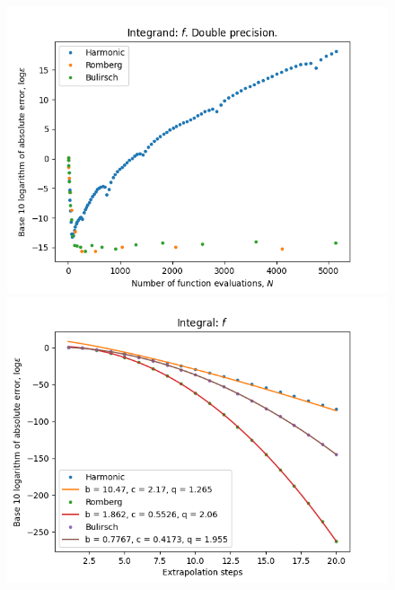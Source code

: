 \begin{figure}[H]
\centering
\begin{minipage}{0.45\textwidth}
\centering
\includegraphics[scale=0.45]{romberg_plots/cos_squared.png}
\end{minipage}
\begin{minipage}{0.45\textwidth}
\centering
\includegraphics[scale=0.45]{romberg_plots/cos_squared_hp_steps.png}
\end{minipage}
\end{figure}

